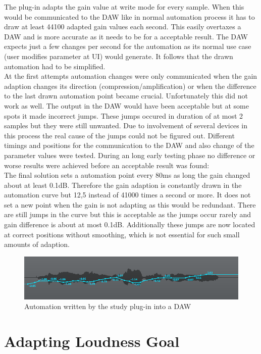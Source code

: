 The plug-in adapts the gain value at write mode for every sample. When this would be communicated to the DAW like in normal automation process it has to draw at least 44100 adapted gain values each second. This easily overtaxes a DAW and is more accurate as it needs to be for a acceptable result. The DAW expects just a few changes per second for the automation as its normal use case (user modifies parameter at UI) would generate. It follows that the drawn automation had to be simplified.\\
At the first attempts automation changes were only communicated when the gain adaption changes its direction (compression/amplification) or when the difference to the last drawn automation point became crucial. Unfortunately this did not work as well. The output in the DAW would have been acceptable but at some spots it made incorrect jumps. These jumps occured in duration of at most 2 samples but they were still unwanted. Due to involvement of several devices in this process the real cause of the jumps could not be figured out. Different timings and positions for the communication to the DAW and also change of the parameter values were tested. During an long early testing phase no difference or worse results were achieved before an acceptable result was found:\\
The final solution sets a automation point every 80ms as long the gain changed about at least 0.1dB.
Therefore the gain adaption is constantly drawn in the automation curve but 12,5 instead of 41000 times a second or more. It does not set a new point when the gain is not adapting as this would be redundant. There are still jumps in the curve but this is acceptable as the jumps occur rarely and gain difference is about at most 0.1dB. Additionally these jumps are now located at correct positions without smoothing, which is not essential for such small amounts of adaption.\\

\begin{figure}[H]
\includegraphics[width=\textwidth]{images/automation}
\caption{Automation written by the study plug-in into a DAW}
\end{figure}

\section{Adapting Loudness Goal}

